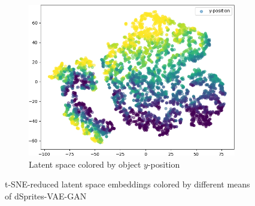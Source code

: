 \begin{figure}[H]
\begin{subfigure}{.19\textwidth}
        \includegraphics[width=\textwidth]{images/latent_spaces/dsprites/vae_gan/embeddings_mu_4.png}
        \caption{Latent space colored by object $y$-position}
    \end{subfigure}
    \caption[dSprites-VAE-GAN - Latent Space]{\ac{t-SNE}-reduced latent space embeddings colored by different means of dSprites-\ac{VAE}-\ac{GAN}}
    \label{fig:vae_gan_latent_space_dsprites}
\end{figure}
